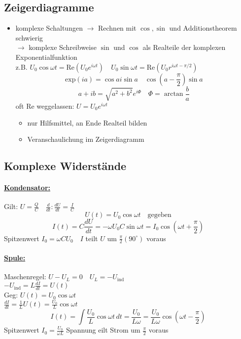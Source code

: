 \documentclass[titlepage,12pt,a4paper,ngerman]{report}
\newcommand{\tx}[1]{\textrm{#1}}
\newcommand{\uind}{U_{\tx{ind}}}
\begin{document}
\subsection{Zeigerdiagramme}
\begin{itemize}
	\item komplexe Schaltungen $ \rightarrow $ Rechnen mit $ \cos ,\sin $ und Additionstheorem schwierig\\
	$ \rightarrow $ komplexe Schreibweise $ \sin $ und $ \cos $ als Realteile der komplexen Exponentialfunktion\\
	z.B. $ U_0 \cos \omega t = \tx{Re}(U_0 e^{i \omega t} ) \quad U_0 \sin \omega t = \tx{Re} ( U_0 r ^{i \omega t - \pi/2}) $\\
	$$ \tx{exp}(i a) = \cos a i \sin a \quad \cos (a- \frac{\pi}{2}) \sin a $$
	$$ a+ib = \sqrt{a^2 + b^2} e^{i\Phi} \quad \Phi = \arctan \frac{b}{a} $$
	oft Re weggelassen: $ U = U_0 e^{i\omega t} $
	\begin{itemize}
		\item nur Hilfsmittel, an Ende Realteil bilden
		\item  Veranschaulichung im Zeigerdiagramm
	\end{itemize}
\end{itemize}

\subsection{Komplexe Widerstände}
\paragraph{\underline{Kondensator:}}
Gilt: $ U = \frac{Q}{C} \quad \frac{d}{dt}: \frac{dU}{dt} = \frac{I}{C} $\\
$$ U(t) = U_0 \cos \omega t \quad \tx{gegeben} $$
$$ I(t) = C \frac{dU}{dt} = - \omega U_0 C \sin \omega t = I_0 \cos (\omega t + \frac{\pi}{2}) $$
Spitzenwert $ I_0 = \omega C U_0 \quad I $ teilt $ U $ um $ \frac{\pi}{2} (90^\circ) $ voraus\\
\paragraph{\underline{Spule:}} Maschenregel: $ U-U_L = 0 \quad U_L = - \uind $\\
$ - \uind = L \frac{dI}{dt} = U(t) $\\
Geg: $ U(t) = U_0 \cos \omega t $\\
$ \frac{dI}{dt} = \frac{1}{L} U(t) = \frac{U_0}{L} \cos \omega t $\\
$$ I(t) = \int \frac{U_0}{L} \cos \omega t \, dt = \frac{U_0}{L\omega} = \frac{U_0}{L\omega} \cos ( \omega t - \frac{\pi}{2}) $$
Spitzenwert $ I_0 = \frac{U_0}{\omega L} $ Spannung eilt Strom um $ \frac{\pi}{2} $ voraus
\end{document}
